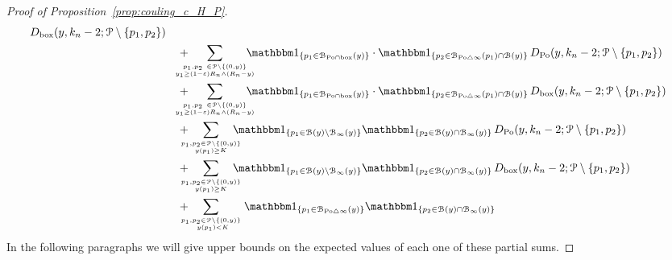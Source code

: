 \begin{proof}[Proof of Proposition~\ref{prop:couling_c_H_P}]
\begin{align}
		\, D_{\text{box}} (y,k_n-2;\Pcal \setminus \{ p_1,p_2\}) \label{eq:sum_2}\\
	&\hspace{10pt}+  \hspace{-15pt} \sum_{p_1,p_2 \ \in \Pcal \setminus \{(0,y) \} 
		\atop y_1 \geq (1-\eps) R_n \wedge (R_n-y)} \hspace{-10pt}
		\ind{p_1 \in \BallInter{y}} \cdot \ind{p_2 \in \BallSym{p_1}\cap \BallHyp{y}} 
		\, D_{\Po} (y,k_n-2;\Pcal \setminus \{ p_1,p_2\}) \label{eq:sum_3} \\
	&\hspace{10pt}+ \hspace{-15pt} \sum_{p_1,p_2 \ \in \Pcal \setminus \{(0,y) \} 
		\atop y_1 \geq (1-\eps) R_n \wedge (R_n-y)} \hspace{-10pt}
		\ind{p_1 \in \BallInter{y}} \cdot \ind{p_2 \in \BallSym{p_1}\cap \BallHyp{y}} 
		\, D_{\text{box}} (y,k_n-2;\Pcal \setminus \{ p_1,p_2\}) \label{eq:sum_4} \\
	&\hspace{10pt}+ \hspace{-10pt} \sum_{p_1,p_2 \in\Pcal \setminus \{(0,y)\} 
		\atop y(p_1) \geq K} \hspace{-10pt} \ind{p_1\in \BallHyp{y}\setminus \BallPo{y}} \ind{p_2\in \BallHyp{y}\cap \BallPo{y}} 
		\, D_{\Po} (y,k_n-2;\Pcal \setminus \{ p_1,p_2\}) \label{eq:sum_5}\\
	&\hspace{10pt}+ \hspace{-10pt} \sum_{p_1,p_2 \in\Pcal \setminus \{(0,y)\} 
			\atop y(p_1) \geq K} \hspace{-10pt} \ind{p_1\in \BallHyp{y}\setminus \BallPo{y}} \ind{p_2\in \BallHyp{y}\cap \BallPo{y}} 
			\, D_{\text{box}} (y,k_n-2;\Pcal \setminus \{ p_1,p_2\}) \label{eq:sum_5b}\\
	&\hspace{10pt}+ \hspace{-10pt} \sum_{p_1,p_2 \in\Pcal \setminus \{(0,y)\} \atop \ y(p_1) < K}
		\ind{p_1\in \BallSym{y}} \ind{p_2\in \BallHyp{y}\cap \BallPo{y}} \label{eq:sum_6}
\end{align}
In the following paragraphs we will give upper bounds on the expected values of each one of these partial sums. 


\end{proof}

